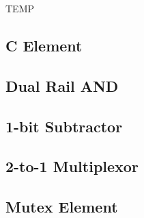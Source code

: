 TEMP

\subsection{C Element}

\subsection{Dual Rail AND}

\subsection{1-bit Subtractor}

\subsection{2-to-1 Multiplexor}

\subsection{Mutex Element}
